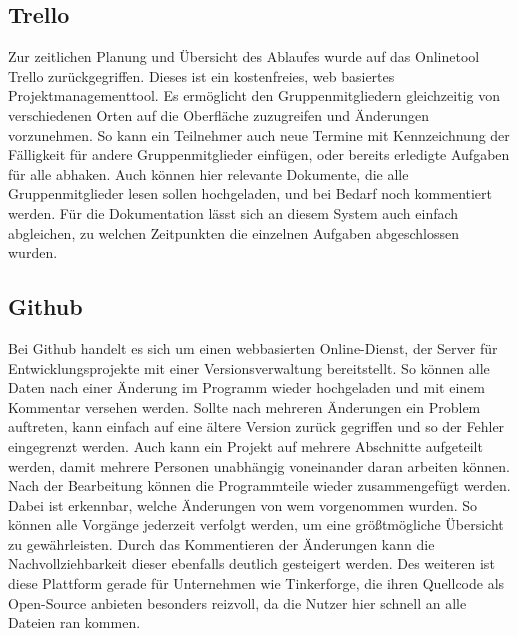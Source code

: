 
\subsection{Trello}
Zur zeitlichen Planung und Übersicht des Ablaufes wurde auf das Onlinetool Trello zurückgegriffen. Dieses ist ein kostenfreies, web basiertes Projektmanagementtool. Es ermöglicht den Gruppenmitgliedern gleichzeitig von verschiedenen Orten auf die Oberfläche zuzugreifen und Änderungen vorzunehmen. So kann ein Teilnehmer auch neue Termine mit Kennzeichnung der Fälligkeit für andere Gruppenmitglieder einfügen, oder bereits erledigte Aufgaben für alle abhaken. Auch können hier relevante Dokumente, die alle Gruppenmitglieder lesen sollen hochgeladen, und bei Bedarf noch kommentiert werden. Für die Dokumentation lässt sich an diesem System auch einfach abgleichen, zu welchen Zeitpunkten die einzelnen Aufgaben abgeschlossen wurden.
\subsection{Github}
Bei Github handelt es sich um einen webbasierten Online-Dienst, der Server für Entwicklungsprojekte mit einer Versionsverwaltung bereitstellt. So können alle Daten nach einer Änderung im Programm wieder hochgeladen und mit einem Kommentar versehen werden. Sollte nach mehreren Änderungen ein Problem auftreten, kann einfach auf eine ältere Version zurück gegriffen und so der Fehler eingegrenzt werden. Auch kann ein Projekt auf mehrere Abschnitte aufgeteilt werden, damit mehrere Personen unabhängig voneinander daran arbeiten können. Nach der Bearbeitung können die Programmteile wieder zusammengefügt werden. Dabei ist erkennbar, welche Änderungen von wem vorgenommen wurden. So können alle Vorgänge jederzeit verfolgt werden, um eine größtmögliche Übersicht zu gewährleisten. Durch das Kommentieren der Änderungen kann die Nachvollziehbarkeit dieser ebenfalls deutlich gesteigert werden. Des weiteren ist diese Plattform gerade für Unternehmen wie Tinkerforge, die ihren Quellcode als Open-Source anbieten besonders reizvoll, da die Nutzer hier schnell an alle Dateien ran kommen.